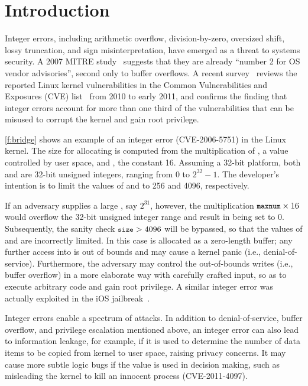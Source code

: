\section{Introduction}
\label{s:intro}

Integer errors, including arithmetic overflow, division-by-zero,
oversized shift, lossy truncation, and sign misinterpretation, have
emerged as a threat to systems security.  A 2007 MITRE
study~\cite{christey:vuln} suggests that they are already ``number
2 for OS vendor advisories'', second only to buffer overflows.  A recent
survey~\cite{chen:kbugs} reviews the reported Linux kernel
vulnerabilities in the Common Vulnerabilities and Exposures (CVE)
list~\cite{cve} from 2010 to early 2011, and confirms the finding
that integer errors account for more than one third of the
vulnerabilities that can be misused to corrupt the kernel and gain
root privilege.

\autoref{f:bridge} shows an example of an integer error (CVE-2006-5751)
in the Linux kernel.  The size for allocating  is computed
from the multiplication of , a value controlled by user
space, and , the constant 16.  Assuming
a 32-bit platform, both  and  are 32-bit unsigned
integers, ranging from 0 to $2^{32} - 1$.  The developer's intention
is to limit the values of  and  to 256 and 4096,
respectively.

If an adversary supplies a large , say $2^{31}$,
however, the multiplication $\cc{maxnum} \times 16$ would
overflow the 32-bit unsigned integer range and result in 
being set to 0.  Subsequently, the sanity check $\cc{size} > 4096$
will be bypassed, so that the values of  and 
are incorrectly limited.  In this case  is allocated as
a zero-length buffer; any further access into  is out of
bounds and may cause a kernel panic (i.e., denial-of-service).
Furthermore, the adversary may control the out-of-bounds writes
(i.e., buffer overflow) in a more elaborate way with carefully
crafted input, so as to execute arbitrary code and gain root
privilege.  A similar integer error was actually exploited
in the iOS jailbreak~\cite{esser:ios}.

Integer errors enable a spectrum of attacks.  In addition to
denial-of-service, buffer overflow, and privilege escalation
mentioned above, an integer error can also lead to information
leakage, for example, if it is used to determine the number of data
items to be copied from kernel to user space, raising privacy
concerns.  It may cause more subtle logic bugs if the value is used
in decision making, such as misleading the kernel to kill an innocent
process (CVE-2011-4097).


